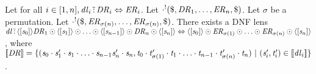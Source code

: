 \documentclass[numbers,10pt,preprint\ifanon ,nocopyrightspace\fi]{sigplanconf}
\begin{document}
\begin{lemma}
  \label{lem:conat-perms}
  Let for all $i \in [1,n], \mathit{dl}_i \,\tilde{:}\,
  \mathit{DR}_i \Leftrightarrow \mathit{ER}_i$.
  Let $\cdot^!(\$,\mathit{DR}_1,\ldots,\mathit{ER}_n,\$)$.
  Let $\sigma$ be a permutation.
  Let $\cdot^!(\$,\mathit{ER}_{\sigma(n)},\ldots,\mathit{ER}_{\sigma(n)},\$)$.
  There exists a DNF lens $\mathit{dl} \,\tilde{:}\, \langle[\mathit{s}_0]\rangle
  \mathit{DR}_1 \odot \langle[\mathit{s}_1]\rangle \odot
  \ldots \odot \langle[\mathit{s}_{n-1}]\rangle \odot
  \mathit{DR}_n \odot \langle[\mathit{s}_n]\rangle \Leftrightarrow
  \langle[\mathit{s}_0]\rangle \odot \mathit{ER}_{\sigma(1)} \odot \ldots \odot
  \mathit{ER}_{\sigma(n)} \odot \langle[\mathit{s}_n]\rangle$, where $[ \! [\mathit{DR}] \! ] =
  \{(\mathit{s}_0\cdot\mathit{s}_1'\cdot\mathit{s}_1\cdot\ldots\cdot\mathit{s}_{n-1}\mathit{s}_n'\cdot\mathit{s}_n,
    \mathit{t}_0\cdot\mathit{t}_{\sigma(1)}'\cdot\mathit{t}_1\cdot\ldots\cdot\mathit{t}_{n-1}\cdot\mathit{t}_{\sigma(n)}'\cdot\mathit{t}_n)
    ~|~
  (\mathit{s}_i',\mathit{t}_i') \in [ \! [\mathit{dl}_i] \! ]\}$.
\end{lemma}
\end{document}

